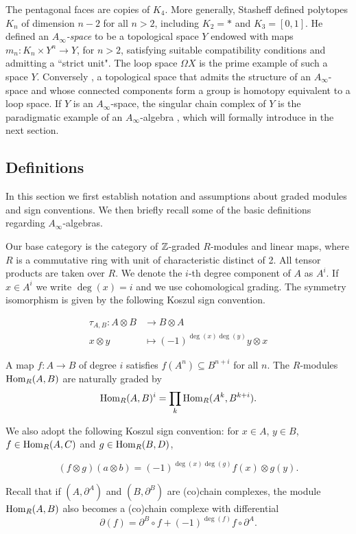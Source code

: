 \documentclass[Thesis.tex]{subfiles}
\begin{document}
The pentagonal faces are copies of $K_4$. More generally, Stasheff \cite{STASHEFFI} defined polytopes $K_n$ of dimension $n−2$ for all $n > 2$, including $K_2 = *$ and $K_3 = [0, 1]$. He defined an \emph{$A_\infty$-space} to be a topological space
$Y$ endowed with maps $m_n : K_n × Y^n \to Y$, for $n > 2$, satisfying suitable compatibility
conditions and admitting a ``strict unit". The loop space $\Omega X$ is the prime example of
such a space $Y$. Conversely \cite{Adams}, a topological space that admits the structure of
an $A_\infty$-space and whose connected components form a group is homotopy equivalent
to a loop space. If $Y$ is an $A_\infty$-space, the singular chain complex of $Y$ is the paradigmatic example
of an $A_\infty$-algebra \cite{STASHEFF}, which will formally introduce in the next section.

\subsection{Definitions}

In this section we first establish notation and assumptions about graded modules and sign conventions. We then briefly recall some of the basic definitions regarding $A_\infty$-algebras.

Our base category is the category of $\mathbb{Z}$-graded $R$-modules and linear maps, where $R$ is a commutative ring with unit of characteristic distinct of 2. All tensor products are taken over $R$. We denote the $i$-th degree component of $A$ as $A^i$. If $x\in A^i$ we write $\deg(x)=i$ and we use cohomological grading. The symmetry isomorphism is given by the following Koszul sign convention.

\begin{align*}
\tau_{A,B}:A\otimes B&\to B\otimes A\\
x\otimes y &\mapsto (-1)^{\deg(x)\deg(y)}y\otimes x
\end{align*}

 A map $f:A\to B$ of degree $i$ satisfies $f(A^n)\subseteq B^{n+i}$ for all $n$. The $R$-modules $\operatorname{Hom}_R(A,B)$ are naturally graded by \[\operatorname{Hom}_R(A,B)^i=\prod_k\operatorname{Hom}_R(A^k,B^{k+i}).\]

We also adopt the following Koszul sign convention: for $x\in A$, $y\in B$, $f\in\operatorname{Hom}_R(A,C)$ and $g\in\operatorname{Hom}_R(B,D)$,

\[(f\otimes g)(a\otimes b)=(-1)^{\deg(x)\deg(g)}f(x)\otimes g(y).\]

Recall that if $(A,\partial^A)$ and $(B,\partial^B)$ are (co)chain complexes, the module $\operatorname{Hom}_R(A,B)$ also becomes a (co)chain complexe with differential
\[\partial(f) = \partial^B\circ f +(-1)^{\deg(f)}f\circ\partial^A.\]
\end{document}
